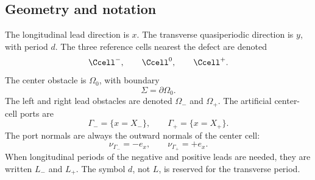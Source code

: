 \subsection{Geometry and notation}

The longitudinal lead direction is \(x\).  The transverse quasiperiodic
direction is \(y\), with period \(d\).  The three reference cells nearest the
defect are denoted
\[
  \Ccell^-,
  \qquad
  \Ccell^0,
  \qquad
  \Ccell^+ .
\]
The center obstacle is \(\Omega_0\), with boundary
\[
  \Sigma=\partial\Omega_0 .
\]
The left and right lead obstacles are denoted \(\Omega_-\) and \(\Omega_+\).
The artificial center-cell ports are
\[
  \Gamma_-=\{x=X_-\},
  \qquad
  \Gamma_+=\{x=X_+\}.
\]
The port normals are always the outward normals of the center cell:
\[
  \nu_{\Gamma_-}=-e_x,
  \qquad
  \nu_{\Gamma_+}=+e_x .
\]
When longitudinal periods of the negative and positive leads are needed, they
are written \(L_-\) and \(L_+\).  The symbol \(d\), not \(L\), is reserved for
the transverse period.

